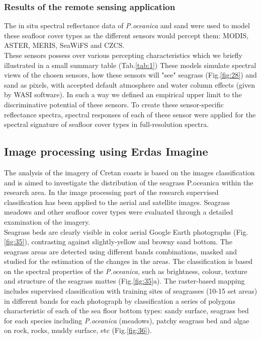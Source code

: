 \documentclass[10pt, a4paper]{article}
\begin{document}
\subsubsection{Results of the remote sensing application}
The in situ spectral reflectance data of \textit{P.oceanica} and sand were used to model these seafloor cover
types as the different sensors would percept them: MODIS, ASTER, MERIS, SeaWiFS and CZCS.\\
These sensors possess over various percepting characteristics which we briefly illustrated in a small summary table (Tab.\ref{tab:1})
These models simulate spectral views of the chosen sensors, how these sensors will "see" seagrass (Fig.\ref{fig:28}) and sand as
pixels, with accepted default atmosphere and water column effects (given by WASI software). In such
a way we defined an empirical upper limit to the discriminative potential of these sensors. To create
these sensor-specific reflectance spectra, spectral responses of each of these sensor were applied for
the spectral signature of seafloor cover types in full-resolution spectra.

\subsection{Image processing using Erdas Imagine}
The analysis of the imagery of Cretan coasts is based on the images classification and is aimed to
investigate the distribution of the seagrass P.oceanica within the research area.
In the image processing part of the research supervised classification has been applied to the aerial
and satellite images. Seagrass meadows and other seafloor cover types were evaluated through a
detailed examination of the imagery. \\
Seagrass beds are clearly visible in color aerial Google Earth
photographs (Fig.\ref{fig:35}), contrasting against slightly-yellow and browny sand bottom. The seagrass areas are
detected using different bands combinations, masked and studied for the estimation of the changes in
the areas. The classification is based on the spectral properties of the \textit{P.oceanica}, such as brightness,
colour, texture and structure of the seagrass mattes (Fig.\ref{fig:35}a). The raster-based mapping
includes supervised classification with training sites of seagrasses (10-15 set areas) in different bands
for each photograph by classification a series of polygons characteristic of each of the sea floor
bottom types: sandy surface, seagrass bed for each species including \textit{P.oceanica} (meadows), patchy
seagrass bed and algae on rock, rocks, muddy surface, etc (Fig.\ref{fig:36}).
\end{document}
